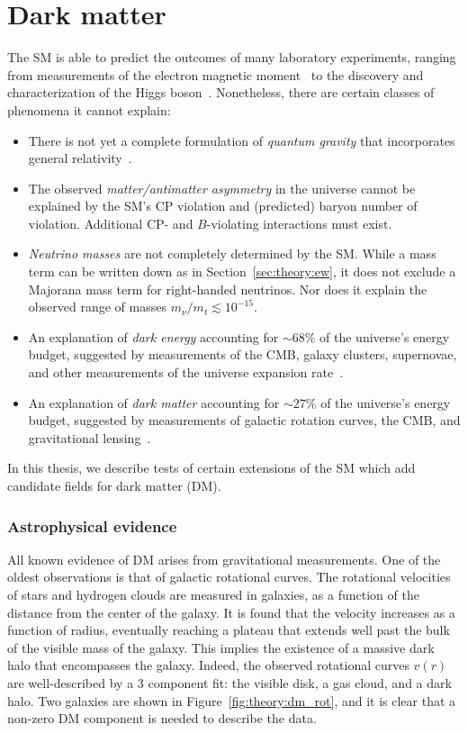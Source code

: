 \section{Dark matter}

The SM is able to predict the outcomes of many laboratory experiments, ranging from measurements of the electron magnetic moment~\cite{eedm} to the discovery and characterization of the Higgs boson~\cite{higgsdisc,higgsprop}.
Nonetheless, there are certain classes of phenomena it cannot explain:
\begin{itemize}
    \item There is not yet a complete formulation of \emph{quantum gravity} that incorporates general relativity~\cite{gr}.
    \item The observed \emph{matter/antimatter asymmetry} in the universe cannot be explained by the SM's CP violation and (predicted) baryon number of violation. 
          Additional CP- and ${B}$-violating interactions must exist.
    \item \emph{Neutrino masses} are not completely determined by the SM. 
            While a mass term can be written down as in Section~\ref{sec:theory:ew}, it does not exclude a Majorana mass term for right-handed neutrinos. 
            Nor does it explain the observed range of masses ${m_\nu/m_t \lesssim 10^{-15}}$. 
    \item An explanation of \emph{dark energy} accounting for ${\sim 68\%}$ of the universe's energy budget, suggested by measurements of the CMB, galaxy clusters, supernovae, and other measurements of the universe expansion rate~\cite{darkenergy}.
    \item An explanation of \emph{dark matter} accounting for ${\sim 27\%}$ of the universe's energy budget, suggested by measurements of galactic rotation curves, the CMB, and gravitational lensing~\cite{pdg,dm1,dm2,dm3}.
\end{itemize}
In this thesis, we describe tests of certain extensions of the SM which add candidate fields for dark matter (DM). 

\subsubsection{Astrophysical evidence}
All known evidence of DM arises from gravitational measurements.
One of the oldest observations is that of galactic rotational curves.
The rotational velocities of stars and hydrogen clouds are measured in galaxies, as a function of the distance from the center of the galaxy.
It is found that the velocity increases as a function of radius, eventually reaching a plateau that extends well past the bulk of the visible mass of the galaxy.
This implies the existence of a massive dark halo that encompasses the galaxy.
Indeed, the observed rotational curves ${v(r)}$ are well-described by a 3 component fit: the visible disk, a gas cloud, and a dark halo. 
Two galaxies are shown in Figure~\ref{fig:theory:dm_rot}, and it is clear that a non-zero DM component is needed to describe the data.

